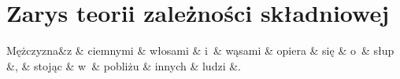 \documentclass[licencjacka]{pracamgr_Kogni}
\begin{document}
\section{Zarys teorii zależności składniowej}



\begin{exe}
    \ex
    \begin{dependency}[theme=simple, edge style = lightgray]
        \begin{deptext}
            Mężczyzna\&z \& ciemnymi \& włosami \& i~\& wąsami \& opiera \& się \& o~\& słup \&, \& stojąc \& w~\& pobliżu \& innych \& ludzi \&. \\
        \end{deptext}
    \end{dependency}
    \label{ex:4}
\end{exe}
\end{document}
